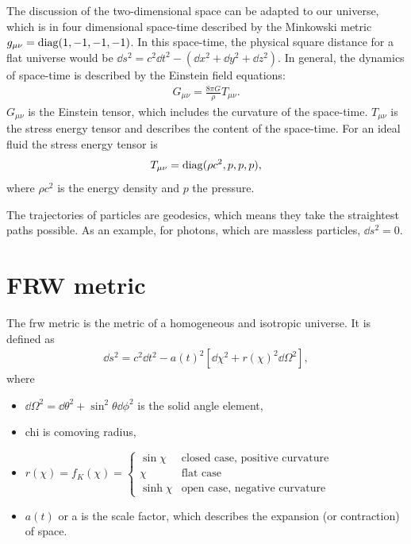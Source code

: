 The discussion of the two-dimensional space can be adapted to our universe, which is in four dimensional space-time described by the Minkowski metric $g_{\mu\nu} = \operatorname{diag}(1, -1, -1, -1)$. In this space-time, the physical square distance for a flat universe would be $\dd{s}^2 = c^2\dd{t}^2- (\dd{x}^2 + \dd{y}^2 + \dd{z}^2)$. In general, the dynamics of space-time is described by the Einstein field equations:
\begin{align*}
	G_{\mu\nu} = \frac{8\pi G}{\rho} T_{\mu\nu}.
\end{align*}
$G_{\mu\nu}$ is the Einstein tensor, which includes the curvature of the space-time. $T_{\mu\nu}$ is the stress energy tensor and describes the content of the space-time. For an ideal fluid the stress energy tensor is
\begin{align*}
	T_{\mu\nu} = \operatorname{diag}(\rho c^2, p, p, p),
\end{align*}
where $\rho c^2$ is the energy density and $p$ the pressure. 

The trajectories of particles are geodesics, which means they take the straightest paths possible. As an example, for photons, which are massless particles, $\dd{s}^2 = 0$.



\section{FRW metric}

The \ac{frw} metric is the metric of a homogeneous and isotropic universe.
It is defined as
\begin{align*}
  \dd{s}^2 = c^2 \dd{t}^2 - a(t)^2 \left[ \dd{\chi}^2 + r(\chi)^2 \dd{\Omega}^2 \right],
\end{align*}
where
\begin{itemize}[nolistsep]
	\item $\dd{\Omega}^2 = \dd{\theta}^2 + \sin^2\theta \dd{\phi}^2$ is the solid angle element,
	\item \gls{chi} is comoving radius,
	\item $\displaystyle
		r(\chi) = f_K(\chi) = 
		\begin{cases}
			\sin \chi & \text{closed case, positive curvature}\\
			\chi & \text{flat case}\\
			\sinh \chi & \text{open case, negative curvature}
		\end{cases}
		$
	\item $a(t)$ or \gls{a} is the scale factor, which describes the expansion (or contraction) of space.
\end{itemize}

